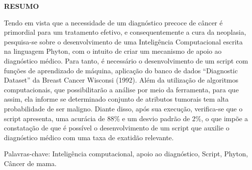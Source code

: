 \begin{center}
\textbf{RESUMO}
\end{center}

$\!$\\
\noindent
Tendo em vista que a necessidade de um diagnóstico precoce de câncer é primordial para um tratamento efetivo, 
e consequentemente a cura da neoplasia,
pesquisa-se sobre o desenvolvimento de uma Inteligência Computacional escrita na linguagem Phyton,
com o intuito de criar um mecanismo de apoio ao diagnóstico médico.
Para tanto, é necessário o desenvolvimento de um script com funções de aprendizado de máquina, 
aplicação do banco de dados “Diagnostic Dataset” da Breast Cancer Wisconsi (1992). 
Além da utilização de algoritmos computacionais, 
que possibilitarão a análise por meio da ferramenta, para que assim, 
ela informe se determinado conjunto de atributos tumorais tem alta probabilidade de ser maligno.  
Diante disso, após sua execução, verifica-se que o script apresenta, uma acurácia de 88\% e um desvio padrão de 2\%,
o que impõe a constatação de que é possível o desenvolvimento de um script que auxilie o diagnóstico médico com uma taxa de exatidão relevante.

\vspace{1cm}

\hspace{-1.3cm}Palavras-chave: Inteligência computacional, apoio ao diagnóstico, Script, Phyton, Câncer de mama.
